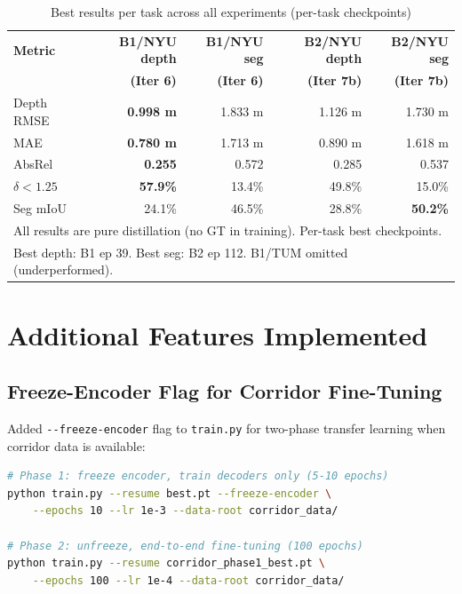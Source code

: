 \documentclass[11pt,a4paper]{article}
\begin{document}
\begin{table}[h]
\centering
\caption{Best results per task across all experiments (per-task checkpoints)}
\label{tab:eval-compare}
\begin{tabular}{lrrrr}
\toprule
\textbf{Metric} & \textbf{B1/NYU depth} & \textbf{B1/NYU seg} & \textbf{B2/NYU depth} & \textbf{B2/NYU seg} \\
               & \textbf{(Iter 6)} & \textbf{(Iter 6)} & \textbf{(Iter 7b)} & \textbf{(Iter 7b)} \\
\midrule
Depth RMSE     & \textcolor{improved}{\textbf{0.998 m}} & 1.833 m & 1.126 m & 1.730 m \\
MAE            & \textcolor{improved}{\textbf{0.780 m}} & 1.713 m & 0.890 m & 1.618 m \\
AbsRel         & \textcolor{improved}{\textbf{0.255}}   & 0.572   & 0.285   & 0.537 \\
$\delta<1.25$  & \textcolor{improved}{\textbf{57.9\%}}  & 13.4\%  & 49.8\%  & 15.0\% \\
\midrule
Seg mIoU       & 24.1\%  & 46.5\%  & 28.8\%  & \textcolor{improved}{\textbf{50.2\%}} \\
\bottomrule
\multicolumn{5}{l}{\footnotesize All results are pure distillation (no GT in training). Per-task best checkpoints.} \\
\multicolumn{5}{l}{\footnotesize Best depth: B1 ep 39. Best seg: B2 ep 112. B1/TUM omitted (underperformed).}
\end{tabular}
\end{table}

\section{Additional Features Implemented}

\subsection{Freeze-Encoder Flag for Corridor Fine-Tuning}

Added \texttt{-{}-freeze-encoder} flag to \texttt{train.py} for two-phase
transfer learning when corridor data is available:

\begin{lstlisting}[language=bash]
# Phase 1: freeze encoder, train decoders only (5-10 epochs)
python train.py --resume best.pt --freeze-encoder \
    --epochs 10 --lr 1e-3 --data-root corridor_data/

# Phase 2: unfreeze, end-to-end fine-tuning (100 epochs)
python train.py --resume corridor_phase1_best.pt \
    --epochs 100 --lr 1e-4 --data-root corridor_data/
\end{lstlisting}
\end{document}
